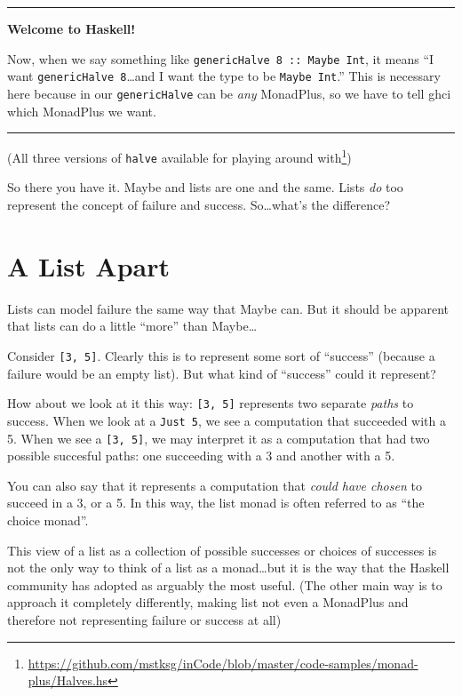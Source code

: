 \documentclass[]{article}
\renewcommand{\href}[2]{#2\footnote{\url{#1}}}
\begin{document}
\begin{center}\rule{0.5\linewidth}{\linethickness}\end{center}

\textbf{Welcome to Haskell!}

Now, when we say something like
\texttt{genericHalve\ 8\ ::\ Maybe\ Int}, it means ``I want
\texttt{genericHalve\ 8}\ldots{}and I want the type to be
\texttt{Maybe\ Int}.'' This is necessary here because in our
\texttt{genericHalve} can be \emph{any} MonadPlus, so we have to tell
ghci which MonadPlus we want.

\begin{center}\rule{0.5\linewidth}{\linethickness}\end{center}

(\href{https://github.com/mstksg/inCode/blob/master/code-samples/monad-plus/Halves.hs}{All
three versions of \texttt{halve} available for playing around with})

So there you have it. Maybe and lists are one and the same. Lists
\emph{do} too represent the concept of failure and success.
So\ldots{}what's the difference?

\section{A List Apart}\label{a-list-apart}

Lists can model failure the same way that Maybe can. But it should be
apparent that lists can do a little ``more'' than Maybe\ldots{}

Consider \texttt{{[}3,\ 5{]}}. Clearly this is to represent some sort of
``success'' (because a failure would be an empty list). But what kind of
``success'' could it represent?

How about we look at it this way: \texttt{{[}3,\ 5{]}} represents two
separate \emph{paths} to success. When we look at a \texttt{Just\ 5}, we
see a computation that succeeded with a 5. When we see a
\texttt{{[}3,\ 5{]}}, we may interpret it as a computation that had two
possible succesful paths: one succeeding with a 3 and another with a 5.

You can also say that it represents a computation that \emph{could have
chosen} to succeed in a 3, or a 5. In this way, the list monad is often
referred to as ``the choice monad''.

This view of a list as a collection of possible successes or choices of
successes is not the only way to think of a list as a monad\ldots{}but
it is the way that the Haskell community has adopted as arguably the
most useful. (The other main way is to approach it completely
differently, making list not even a MonadPlus and therefore not
representing failure or success at all)
\end{document}
